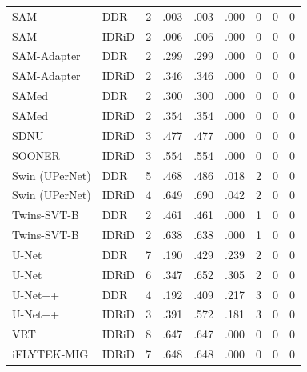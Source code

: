 {\begin{longtable}{l l c c c c c c c}
SAM & DDR & 2 & .003 & .003 & .000 & 0 & 0 & 0 \\
SAM & IDRiD & 2 & .006 & .006 & .000 & 0 & 0 & 0 \\
SAM-Adapter & DDR & 2 & .299 & .299 & .000 & 0 & 0 & 0 \\
SAM-Adapter & IDRiD & 2 & .346 & .346 & .000 & 0 & 0 & 0 \\
SAMed & DDR & 2 & .300 & .300 & .000 & 0 & 0 & 0 \\
SAMed & IDRiD & 2 & .354 & .354 & .000 & 0 & 0 & 0 \\
SDNU & IDRiD & 3 & .477 & .477 & .000 & 0 & 0 & 0 \\
SOONER & IDRiD & 3 & .554 & .554 & .000 & 0 & 0 & 0 \\
Swin (UPerNet) & DDR & 5 & .468 & .486 & .018 & 2 & 0 & 0 \\
Swin (UPerNet) & IDRiD & 4 & .649 & .690 & .042 & 2 & 0 & 0 \\
Twins-SVT-B & DDR & 2 & .461 & .461 & .000 & 1 & 0 & 0 \\
Twins-SVT-B & IDRiD & 2 & .638 & .638 & .000 & 1 & 0 & 0 \\
U-Net & DDR & 7 & .190 & .429 & .239 & 2 & 0 & 0 \\
U-Net & IDRiD & 6 & .347 & .652 & .305 & 2 & 0 & 0 \\
U-Net++ & DDR & 4 & .192 & .409 & .217 & 3 & 0 & 0 \\
U-Net++ & IDRiD & 3 & .391 & .572 & .181 & 3 & 0 & 0 \\
VRT & IDRiD & 8 & .647 & .647 & .000 & 0 & 0 & 0 \\
iFLYTEK-MIG & IDRiD & 7 & .648 & .648 & .000 & 0 & 0 & 0 \\
\end{longtable}
}
\vspace{-6pt}
